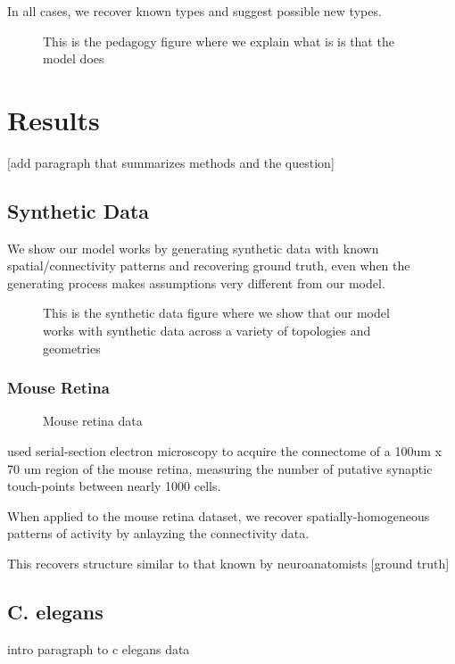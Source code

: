 \documentclass{article}
\begin{document}
In all cases, we recover known types and suggest possible new types. 

\begin{figure}
  \centering 
  \caption{This is the pedagogy figure where we explain what is is that the model does }
\end{figure}

\section{Results}
[add paragraph that summarizes methods and the question]

\subsection{Synthetic Data}
We show our model works by generating synthetic data with known
spatial/connectivity patterns and recovering ground truth, even when
the generating process makes assumptions very different from our
model.

\begin{figure}
  \centering 
  \caption{This is the synthetic data figure where we show that our model works with synthetic data across a variety of topologies and geometries}
\end{figure}

\subsubsection{Mouse Retina}

\begin{figure}
  \centering 
  \caption{Mouse retina data}
\end{figure}

\autocite{retina} used serial-section electron microscopy to acquire the connectome
of a 100um x 70 um region of the mouse retina, measuring the number of putative
synaptic touch-points between nearly 1000 cells. 

When applied to the mouse retina dataset, we recover
spatially-homogeneous patterns of activity by anlayzing the
connectivity data.

This recovers structure similar to that known by neuroanatomists [ground truth]


\subsection{C. elegans}
intro paragraph to c elegans data
\end{document}
